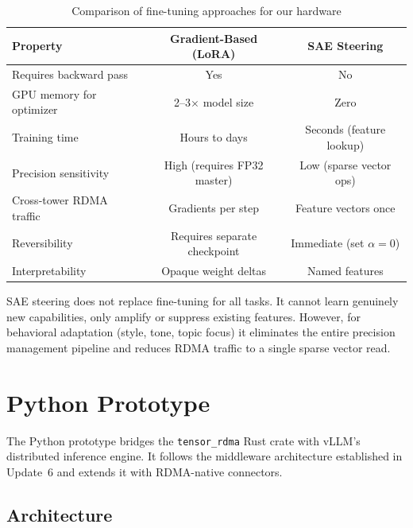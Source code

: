 \documentclass[11pt,letterpaper]{article}
\theoremstyle{definition}
\begin{document}
\begin{table}[htbp]
\centering
\caption{Comparison of fine-tuning approaches for our hardware}
\label{tab:finetuning-comparison}
\begin{tabular}{@{}lcc@{}}
\toprule
\textbf{Property} & \textbf{Gradient-Based (LoRA)} & \textbf{SAE Steering} \\
\midrule
Requires backward pass & Yes & No \\
GPU memory for optimizer & 2--3$\times$ model size & Zero \\
Training time & Hours to days & Seconds (feature lookup) \\
Precision sensitivity & High (requires FP32 master) & Low (sparse vector ops) \\
Cross-tower RDMA traffic & Gradients per step & Feature vectors once \\
Reversibility & Requires separate checkpoint & Immediate (set $\alpha = 0$) \\
Interpretability & Opaque weight deltas & Named features \\
\bottomrule
\end{tabular}
\end{table}

SAE steering does not replace fine-tuning for all tasks. It cannot learn genuinely new capabilities, only amplify or suppress existing features. However, for behavioral adaptation (style, tone, topic focus) it eliminates the entire precision management pipeline and reduces RDMA traffic to a single sparse vector read.

\section{Python Prototype}
\label{sec:python-prototype}

The Python prototype bridges the \texttt{tensor\_rdma} Rust crate with vLLM's distributed inference engine. It follows the middleware architecture established in Update~6 and extends it with RDMA-native connectors.

\subsection{Architecture}
\end{document}
